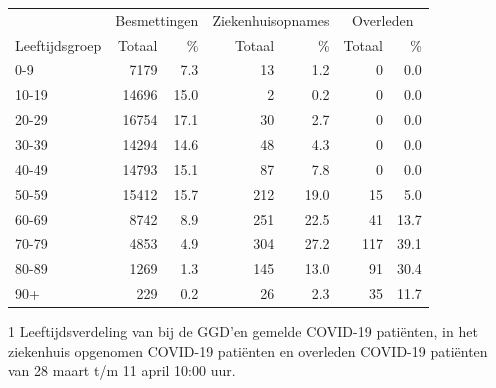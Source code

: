 \documentclass[
  english,
  man,floatsintext]{apa6}
\begin{document}
\begin{table}
\centering\begingroup\fontsize{11}{13}\selectfont

\begin{threeparttable}
\begin{tabular}{lrrrrrr}
\toprule
\multicolumn{1}{c}{ } & \multicolumn{2}{c}{Besmettingen} & \multicolumn{2}{c}{Ziekenhuisopnames} & \multicolumn{2}{c}{Overleden} \\
\cmidrule(l{3pt}r{3pt}){2-3} \cmidrule(l{3pt}r{3pt}){4-5} \cmidrule(l{3pt}r{3pt}){6-7}
Leeftijdsgroep & Totaal & \% & Totaal & \% & Totaal & \%\\
\midrule
0-9 & 7179 & 7.3 & 13 & 1.2 & 0 & 0.0\\
10-19 & 14696 & 15.0 & 2 & 0.2 & 0 & 0.0\\
20-29 & 16754 & 17.1 & 30 & 2.7 & 0 & 0.0\\
30-39 & 14294 & 14.6 & 48 & 4.3 & 0 & 0.0\\
40-49 & 14793 & 15.1 & 87 & 7.8 & 0 & 0.0\\
50-59 & 15412 & 15.7 & 212 & 19.0 & 15 & 5.0\\
60-69 & 8742 & 8.9 & 251 & 22.5 & 41 & 13.7\\
70-79 & 4853 & 4.9 & 304 & 27.2 & 117 & 39.1\\
80-89 & 1269 & 1.3 & 145 & 13.0 & 91 & 30.4\\
90+ & 229 & 0.2 & 26 & 2.3 & 35 & 11.7\\
\bottomrule
\end{tabular}
\begin{tablenotes}
\item[1] Leeftijdsverdeling van bij de GGD’en gemelde COVID-19 patiënten, in het ziekenhuis opgenomen COVID-19 patiënten en overleden COVID-19 patiënten van 28 maart t/m 11 april 10:00 uur.
\end{tablenotes}
\end{threeparttable}
\endgroup{}
\end{table}

\newpage
\end{document}
